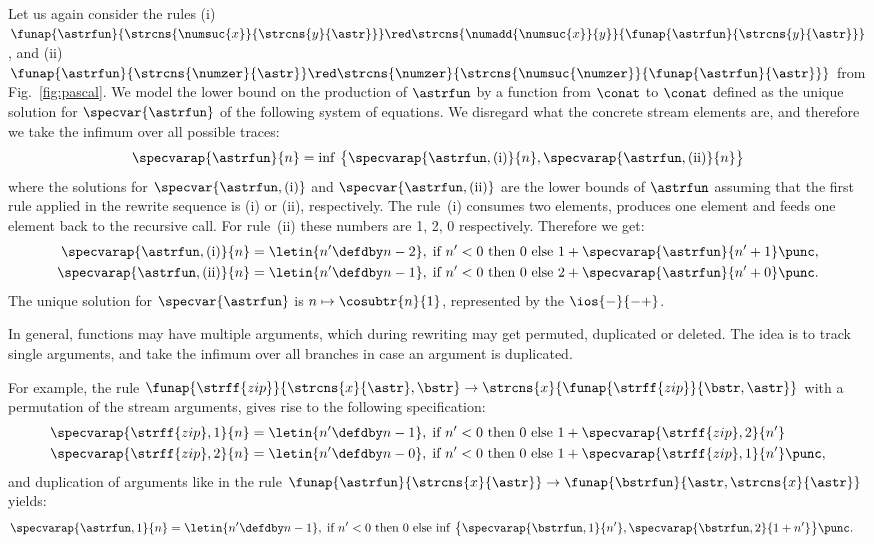 Let us again consider the rules
(i)~$\funap{\astrfun}{\strcns{\numsuc{x}}{\strcns{y}{\astr}}} 
  \red \strcns{\numadd{\numsuc{x}}{y}}{\funap{\astrfun}{\strcns{y}{\astr}}}$,
and
(ii)~$\funap{\astrfun}{\strcns{\numzer}{\astr}} 
  \red \strcns{\numzer}{\strcns{\numsuc{\numzer}}{\funap{\astrfun}{\astr}}}$
  from Fig.~\ref{fig:pascal}.
We model the \daob{} lower bound on the production of $\astrfun$ 
by a function from $\conat$ to $\conat$ %
defined as the unique solution for $\specvar{\astrfun}$ of the following system of equations.
We disregard what the concrete stream elements are,
and therefore we take the infimum over all possible traces:
\[
  \specvarap{\astrfun}{n} 
  = \inf\, \big\{ \specvarap{\astrfun,\text{(i)}}{n}, \specvarap{\astrfun,\text{(ii)}}{n} \big\}
\]
where the solutions for $\specvar{\astrfun,\text{(i)}}$ and $\specvar{\astrfun,\text{(ii)}}$
are the \daob{} lower bounds of $\astrfun$ assuming
that the first rule applied in the rewrite sequence is (i) or (ii), respectively.
The rule~(i) consumes two elements, produces one element 
and feeds one element back to the recursive call.
For rule~(ii) these numbers are 1, 2, 0 respectively.
Therefore we get:
\begin{align*}
  \specvarap{\astrfun,\text{(i)}}{n} 
  & = \letin{n' \defdby n-2},\;
      \text{if $n' < 0$ then $0$ else $1 + \specvarap{\astrfun}{n'+1}$}
  \punc,
  \\
  \specvarap{\astrfun,\text{(ii)}}{n} 
  & = \letin{n' \defdby n-1},\; 
      \text{if $n' < 0$ then $0$ else $2 + \specvarap{\astrfun}{n'+0}$}
  \punc.
\end{align*}
The unique solution for $\specvar{\astrfun}$ is $n \mapsto \cosubtr{n}{1}$, 
represented by the \ioterm{} $\ios{-}{-+}$. \label{trans:Pascal:f}

In general, functions may have multiple arguments, 
which during rewriting may get permuted,  duplicated or deleted.
The idea is to track single arguments, and take the infimum 
over all branches in case an argument is duplicated.

For example, the rule 
$\funap{\strff{zip}}{\strcns{x}{\astr}, \bstr} \to \strcns{x}{\funap{\strff{zip}}{\bstr,\astr}}$
with a permutation of the stream arguments, gives rise to the following specification:
\begin{align*}
  \specvarap{\strff{zip},1}{n}
    &= \letin{n' \defdby n-1},\;
       \text{if $n' < 0$ then $0$ else $1 + \specvarap{\strff{zip},2}{n'}$}
  \\
  \specvarap{\strff{zip},2}{n}
    &= \letin{n' \defdby n-0},\;
       \text{if $n' < 0$ then $0$ else $1 + \specvarap{\strff{zip},1}{n'}$}
  \punc,
\end{align*}
and duplication of arguments like in the rule
$\funap{\astrfun}{\strcns{x}{\astr}} \to \funap{\bstrfun}{\astr, \strcns{x}{\astr}}$
yields:
\begin{align*}
  \specvarap{\astrfun,1}{n}
    &= \letin{n' \defdby n-1},\;
       \text{if $n' < 0$ then $0$ else $\inf\, \big\{ \specvarap{\bstrfun,1}{n'}, \specvarap{\bstrfun,2}{1+n'} \big\}$}
  \punc.
\end{align*}

